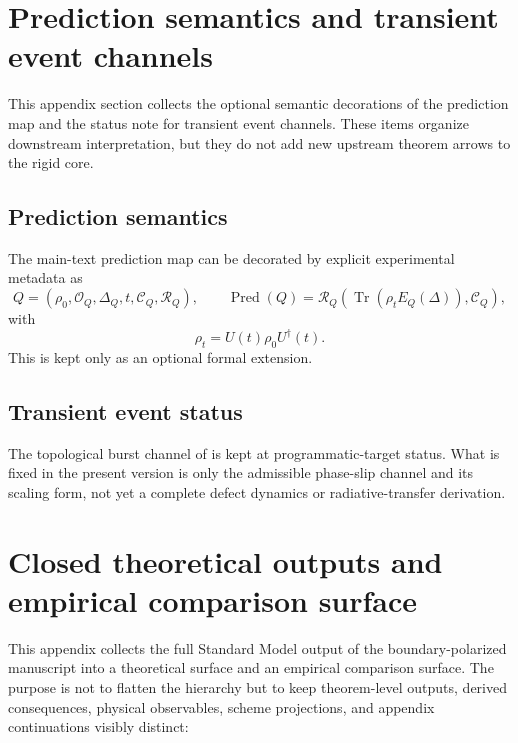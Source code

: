 \documentclass[11pt,a4paper]{article}
\theoremstyle{definition}
\theoremstyle{remark}
\DeclareMathOperator{\tr}{Tr}
\newcommand{\Pred}{\operatorname{Pred}}
\begin{document}
\section{Prediction semantics and transient event channels}
\label{app:prediction-semantics}

This appendix section collects the optional semantic decorations of the prediction map and the
status note for transient event channels. These items organize downstream interpretation, but they
do not add new upstream theorem arrows to the rigid core.

\subsection{Prediction semantics}

The main-text prediction map can be decorated by explicit experimental metadata as
\[
Q=(\rho_0,\mathcal O_Q,\Delta_Q,t,\mathcal C_Q,\mathcal R_Q),
\qquad
\Pred(Q)=\mathcal R_Q\!\left(\tr(\rho_tE_Q(\Delta)),\mathcal C_Q\right),
\]
with
\[
\rho_t=U(t)\rho_0U^\dagger(t).
\]
This is kept only as an optional formal extension.

\subsection{Transient event status}

The topological burst channel of  is kept at
programmatic-target status. What is fixed in the present version is only the admissible phase-slip
channel and its scaling form, not yet a complete defect dynamics or radiative-transfer derivation.

\section{Closed theoretical outputs and empirical comparison surface}
\label{app:global-particle-ledger}

This appendix collects the full Standard Model output of the boundary-polarized manuscript into a
theoretical surface and an empirical comparison surface. The purpose is not to flatten the
hierarchy but to keep theorem-level outputs, derived consequences, physical observables, scheme projections, and appendix continuations
visibly distinct:
\end{document}
